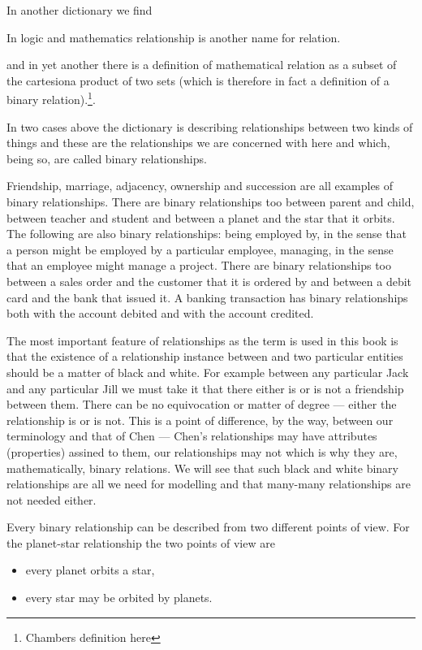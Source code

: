 \mynote
In another dictionary we find 
\begin{erquote}
In logic and mathematics relationship is another name for relation.
\end{erquote}
and in yet another there is a definition of mathematical relation as a subset of the cartesiona product of two sets (which is therefore in fact a definition of a binary relation).\footnote{Chambers definition here}.
 
\mynote In two cases above the dictionary is describing relationships between two kinds of things and these are the relationships we are concerned with here and which, being so, are called binary relationships.

\mynote
Friendship,  marriage, adjacency, ownership and succession are all examples of binary relationships. There are binary relationships too  between parent and child, between teacher and student and between a planet and the star that it orbits.   
The following are also binary relationships:
being employed by, in the sense that a person might be employed by a particular employee,
managing, in the sense that an employee might manage a project. There are binary relationships too between a sales order and the customer that it is ordered by and between a debit card and  the bank that issued it. A banking transaction has binary relationships both with the account debited and with the account credited. 

\mynote The most important feature of relationships as the term is used  in this book is that the existence of a relationship instance between and two particular entities should be a matter of black and white. For example between any particular Jack and any particular Jill we must take it that there either is or is not a friendship between them. There can be no equivocation or matter of degree --- either the relationship is or is not. This is a point of difference, by the way, between our terminology and that of Chen --- Chen's relationships may have attributes (properties) assined to them, our relationships may not which is why they are, mathematically, binary relations. We will see that such black and white binary relationships are all we need for modelling and that many-many relationships are not needed either. 

\mynote 
Every binary relationship can be described from two different points of view. 
For the planet-star relationship the two points of view are
\begin{itemize}
\item every planet orbits a star,
\item every star may be orbited by planets.
\end{itemize}


